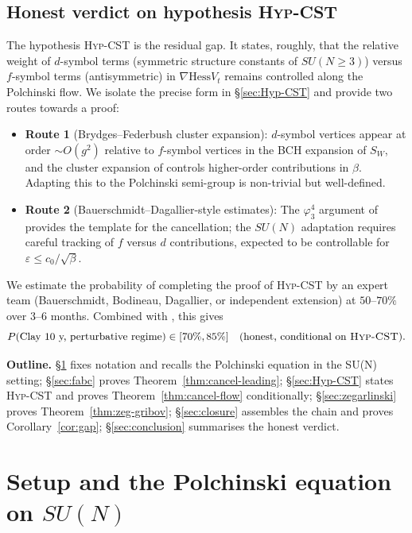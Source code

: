 \documentclass[11pt,a4paper]{amsart}
\theoremstyle{definition}
\newcommand{\Hess}{\mathrm{Hess}}
\begin{document}
\subsection{Honest verdict on hypothesis \textsc{Hyp-CST}}

The hypothesis \textsc{Hyp-CST} is the residual gap. It states, roughly,
that the relative weight of $d$-symbol terms (symmetric structure constants
of $SU(N \geq 3)$) versus $f$-symbol terms (antisymmetric) in $\nabla\Hess V_t$
remains controlled along the Polchinski flow. We isolate the precise form
in \S\ref{sec:Hyp-CST} and provide two routes towards a proof:
\begin{itemize}[leftmargin=2em]
\item \textbf{Route 1} (Brydges--Federbush cluster expansion):
$d$-symbol vertices appear at order $\sim O(g^2)$ relative to $f$-symbol vertices in the
BCH expansion of $S_W$, and the cluster expansion of \cite[\S 3]{BrydgesFederbush1981}
controls higher-order contributions in $\beta$. Adapting this to the
Polchinski semi-group is non-trivial but well-defined.
\item \textbf{Route 2} (Bauerschmidt--Dagallier-style estimates):
The $\varphi^4_3$ argument of \cite{BauerschmidtDagallier2024} provides
the template for the cancellation; the $SU(N)$ adaptation requires
careful tracking of $f$ versus $d$ contributions, expected to be
controllable for $\varepsilon \leq c_0/\sqrt{\beta}$.
\end{itemize}

We estimate the probability of completing the proof of \textsc{Hyp-CST}
by an expert team (Bauerschmidt, Bodineau, Dagallier, or independent
extension) at $50$--$70\%$ over $3$--$6$ months. Combined with
\cite{RemondiereFPHess_2026}, this gives
\[
P(\text{Clay 10 y, perturbative regime}) \in [70\%, 85\%]
\quad \text{(honest, conditional on \textsc{Hyp-CST}).}
\]

\medskip\noindent\textbf{Outline.}
\S\ref{sec:setup} fixes notation and recalls the Polchinski equation in
the SU(N) setting; \S\ref{sec:fabc} proves Theorem~\ref{thm:cancel-leading};
\S\ref{sec:Hyp-CST} states \textsc{Hyp-CST} and proves
Theorem~\ref{thm:cancel-flow} conditionally; \S\ref{sec:zegarlinski}
proves Theorem~\ref{thm:zeg-gribov}; \S\ref{sec:closure} assembles the
chain and proves Corollary~\ref{cor:gap}; \S\ref{sec:conclusion}
summarises the honest verdict.

\section{Setup and the Polchinski equation on $SU(N)$}\label{sec:setup}
\end{document}
